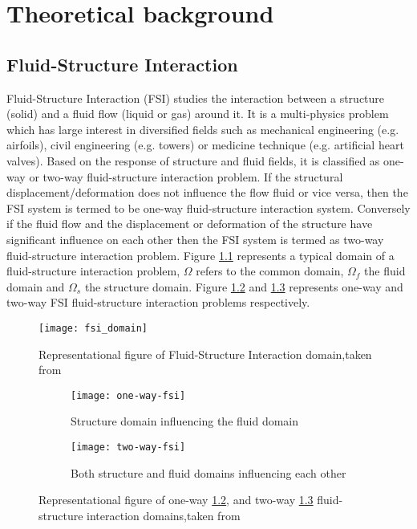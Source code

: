 %
% 

\chapter{Theoretical background}
\label{sec:background}

\section{Fluid-Structure Interaction}
Fluid-Structure Interaction (FSI) studies the interaction between a structure (solid) and a fluid flow (liquid or gas) around it. It is a multi-physics problem which has large interest in diversified fields such as mechanical engineering (e.g. airfoils), civil engineering (e.g. towers) or medicine technique (e.g. artificial heart valves). Based on the response of structure and fluid fields, it is classified as one-way or two-way fluid-structure interaction problem. If the structural displacement/deformation does not influence the flow fluid or vice versa, then the FSI system is termed to be one-way fluid-structure interaction system. Conversely if the fluid flow and the displacement or deformation of the structure have significant influence on each other then the FSI system is termed as two-way fluid-structure interaction problem. Figure \ref{fig:2.1} represents a typical domain of a fluid-structure interaction problem, $\Omega$ refers to the common domain, $ \Omega_{f} $ the fluid domain and $ \Omega_{s} $ the structure domain. Figure   \ref{fig:2.2a} and \ref{fig:2.2b} represents one-way and two-way FSI fluid-structure interaction problems respectively.\\

\begin{figure}[H]
	\centering
	\texttt{[image: fsi\_domain]}
	\caption{Representational figure of Fluid-Structure Interaction domain,taken from \citet{Richter}}
	\label{fig:2.1}
\end{figure}

\begin{figure}[h]
  \centering
  \captionsetup{justification=centering}
  \begin{subfigure}[b]{0.8\linewidth}
    \texttt{[image: one-way-fsi]}
    \caption{Structure domain influencing the fluid domain}
    \label{fig:2.2a}
  \end{subfigure}
  \begin{subfigure}[b]{0.8\linewidth}
    \texttt{[image: two-way-fsi]}
    \caption{Both structure and fluid domains influencing each other}
    \label{fig:2.2b}
  \end{subfigure}
  \caption{Representational figure of one-way \ref{fig:2.2a}, and two-way \ref{fig:2.2b} fluid-structure interaction domains,taken from \citet{Richter}}
  \label{fig:2.2}
\end{figure}

